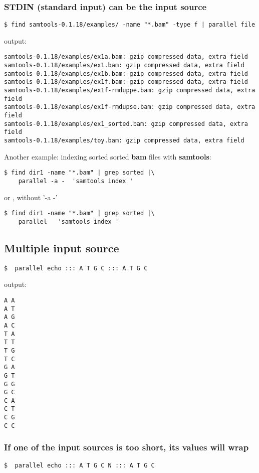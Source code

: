 \documentclass{article}
\def\bam{\textbf{bam}}
\def\samtools{\textbf{samtools}}
\begin{document}
\subsubsection{STDIN (standard input) can be the input source}
\begin{lstlisting}
$ find samtools-0.1.18/examples/ -name "*.bam" -type f | parallel file
\end{lstlisting}
output:
\begin{lstlisting}
samtools-0.1.18/examples/ex1a.bam: gzip compressed data, extra field
samtools-0.1.18/examples/ex1.bam: gzip compressed data, extra field
samtools-0.1.18/examples/ex1b.bam: gzip compressed data, extra field
samtools-0.1.18/examples/ex1f.bam: gzip compressed data, extra field
samtools-0.1.18/examples/ex1f-rmduppe.bam: gzip compressed data, extra field
samtools-0.1.18/examples/ex1f-rmdupse.bam: gzip compressed data, extra field
samtools-0.1.18/examples/ex1_sorted.bam: gzip compressed data, extra field
samtools-0.1.18/examples/toy.bam: gzip compressed data, extra field
\end{lstlisting}


Another example: indexing sorted sorted \bam{} files with \samtools{}:
\begin{lstlisting}
$ find dir1 -name "*.bam" | grep sorted |\
	parallel -a -  'samtools index '
\end{lstlisting}
or , without '-a -'
\begin{lstlisting}
$ find dir1 -name "*.bam" | grep sorted |\
	parallel   'samtools index '
\end{lstlisting}

\subsection{Multiple input source}


\begin{lstlisting}
$  parallel echo ::: A T G C ::: A T G C
\end{lstlisting}
output:
\begin{lstlisting}
A A
A T
A G
A C
T A
T T
T G
T C
G A
G T
G G
G C
C A
C T
C G
C C
\end{lstlisting}

\subsubsection{If one of the input sources is too short, its values will wrap}
\begin{lstlisting}
$  parallel echo ::: A T G C N ::: A T G C
\end{lstlisting}
\end{document}
